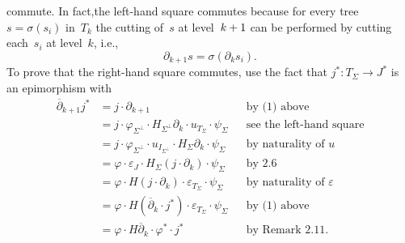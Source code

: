 \documentclass{entcs}
\begin{document}
\begin{pf}
\noindent
commute. In fact,the left-hand square commutes because for every
tree $s=\sigma(s_i)$ in~$T_k$ the cutting of~$s$ at
level~$k+\nolinebreak1$ can be performed by cutting each~$s_i$ at
level~$k$, i.e.,
\[\partial_{k+1}s=\sigma(\partial_ks_i).\]
To prove that the right-hand square commutes, use the fact that
$j^*\colon T_\Sigma\to J^*$ is an epimorphism with
\begin{align*}
\overline{\partial}_{k+1}j^*&=j{\cdot}\partial _{k+1}&&\text{by (1) above}\\
&=j{\cdot}\varphi_{\Sigma^\perp}{\cdot}H_{\Sigma^\perp}\partial_k{\cdot}
u_{T_\Sigma}{\cdot}\psi_\Sigma&&\text{see the left-hand square}\\
&=j{\cdot}\varphi_{\Sigma^\perp}{\cdot}u_{I_{\Sigma^\perp}}{\cdot}
H_\Sigma\partial_k{\cdot}\psi_{\Sigma}&&\text{by naturality of $u$}\\
&=\varphi{\cdot}\varepsilon_J{\cdot}H_\Sigma(j{\cdot}\partial_k){\cdot}\psi_\Sigma&&
\text{by 2.6}\\
&=\varphi{\cdot}H(j{\cdot}\partial_k){\cdot}\varepsilon_{T_\Sigma}{\cdot}
\psi_\Sigma&&\text{by naturality of $\varepsilon$}\\
&=\varphi{\cdot}H(\overline{\partial}_k{\cdot}j^*){\cdot} \varepsilon_{T_\Sigma}
{\cdot}\psi_\Sigma&&\text{by (1) above}\\
&=\varphi{\cdot}H\overline{\partial}_k{\cdot}\varphi^*{\cdot}j^*&&
\text{by Remark 2.11.}
\end{align*}


\end{pf}
\end{document}
